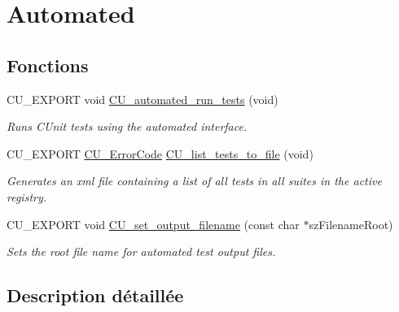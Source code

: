 \hypertarget{group__Automated}{\section{Automated}
\label{group__Automated}
}
\subsection*{Fonctions}
\begin{DoxyCompactItemize}
\item 
C\-U\-\_\-\-E\-X\-P\-O\-R\-T void \hyperlink{group__Automated_ga4204c6d187aa6c366a8f4e0ba50645b4}{C\-U\-\_\-automated\-\_\-run\-\_\-tests} (void)
\begin{DoxyCompactList}\small\item\em Runs C\-Unit tests using the automated interface. \end{DoxyCompactList}\item 
C\-U\-\_\-\-E\-X\-P\-O\-R\-T \hyperlink{group__Framework_ga743a2a025ee3eb792d7d85f0eea347e6}{C\-U\-\_\-\-Error\-Code} \hyperlink{group__Automated_ga4bf1c3a0b54cb2a12d634e7e022edf30}{C\-U\-\_\-list\-\_\-tests\-\_\-to\-\_\-file} (void)
\begin{DoxyCompactList}\small\item\em Generates an xml file containing a list of all tests in all suites in the active registry. \end{DoxyCompactList}\item 
C\-U\-\_\-\-E\-X\-P\-O\-R\-T void \hyperlink{group__Automated_ga60583b154146b787f03267fc320f86e5}{C\-U\-\_\-set\-\_\-output\-\_\-filename} (const char $\ast$sz\-Filename\-Root)
\begin{DoxyCompactList}\small\item\em Sets the root file name for automated test output files. \end{DoxyCompactList}\end{DoxyCompactItemize}


\subsection{Description détaillée}


